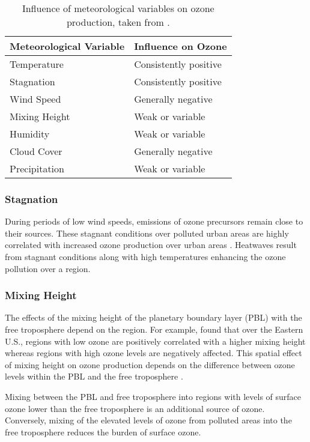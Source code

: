 \begin{table}[t]%
    \centering%
    \caption[Influence of meteorological variables on ozone production]{Influence of meteorological variables on ozone production, taken from \citet{Jacob:2009}.}%
    \begin{tabular}{ll}%
        \hline \hline
        \textbf{Meteorological Variable} & \textbf{Influence on Ozone} \\
        \hline \hline
        Temperature & Consistently positive \\
        Stagnation & Consistently positive \\
        Wind Speed & Generally negative \\
        Mixing Height & Weak or variable \\
        Humidity & Weak or variable \\
        Cloud Cover & Generally negative \\
        Precipitation & Weak or variable \\
        \hline \hline
    \end{tabular}%
    \label{t:meteo_vars}%
\end{table}%

\subsubsection{Stagnation}
During periods of low wind speeds, emissions of ozone precursors remain close to their sources.
These stagnant conditions over polluted urban areas are highly correlated with increased ozone production over urban areas \citep{Jacob:2009}.
Heatwaves result from stagnant conditions along with high temperatures enhancing the ozone pollution over a region.

\subsubsection{Mixing Height}
The effects of the mixing height of the planetary boundary layer (PBL) with the free troposphere depend on the region.
For example, \citet{Dawson:2007} found that over the Eastern U.S., regions with low ozone are positively correlated with a higher mixing height whereas regions with high ozone levels are negatively affected.
This spatial effect of mixing height on ozone production depends on the difference between ozone levels within the PBL and the free troposphere \citep{Jacob:2009}.

Mixing between the PBL and free troposphere into regions with levels of surface ozone lower than the free troposphere is an additional source of ozone.
Conversely, mixing of the elevated levels of ozone from polluted areas into the free troposphere reduces the burden of surface ozone.

